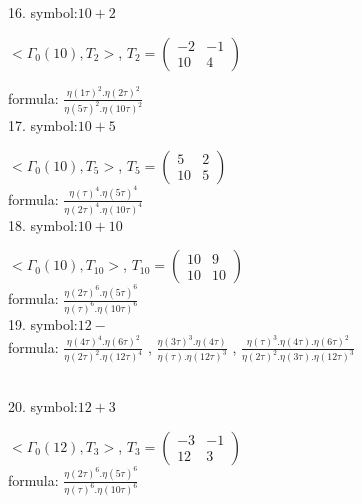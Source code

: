 

16. symbol:$ 10+2 $

$ < \Gamma_0 ( 10 ), T_2 >  $,
$
T_2 = 
\left(
\begin{array}{cc}
-2 & -1 \\
10 & 4
\end{array}
\right)
$

formula: 
$ \frac{\eta(1\tau)^2 . \eta(2\tau)^2}{\eta(5\tau)^2 . \eta(10\tau)^2} $
\\

17. symbol:$ 10+5 $

$ < \Gamma_0 ( 10 ), T_5 >  $,
$
T_5 = 
\left(
\begin{array}{cc}
5 & 2 \\
10 & 5
\end{array}
\right)
$
\\

formula: 
$ \frac{\eta(\tau)^4 . \eta(5\tau)^4}{\eta(2\tau)^4 . \eta(10\tau)^4} $
\\

18. symbol:$ 10+10 $

$ < \Gamma_0 ( 10 ), T_{10} >  $,
$
T_{10} = 
\left(
\begin{array}{cc}
10 & 9 \\
10 & 10
\end{array}
\right)
$
\\

formula: 
$ \frac{\eta(2\tau)^6 . \eta(5\tau)^6}{\eta(\tau)^6 . \eta(10\tau)^6} $
\\

19. symbol:$ 12- $
\\

formula: 
$ \frac{\eta(4\tau)^4 . \eta(6\tau)^2}{\eta(2\tau)^2 . \eta(12\tau)^4} $
, 
$ \frac{\eta(3\tau)^3 . \eta(4\tau)}{\eta(\tau) . \eta(12\tau)^3} $
, 
$ \frac{\eta(\tau)^3 . \eta(4\tau).\eta(6\tau)^2}{\eta(2\tau)^2 .\eta(3\tau). \eta(12\tau)^3} $

\\

20. symbol:$ 12+3 $

$ < \Gamma_0 ( 12 ), T_{3} >  $,
$
T_{3} = 
\left(
\begin{array}{cc}
-3 & -1 \\
12 & 3
\end{array}
\right)
$
\\

formula: 
$ \frac{\eta(2\tau)^6 . \eta(5\tau)^6}{\eta(\tau)^6 . \eta(10\tau)^6} $
\\

